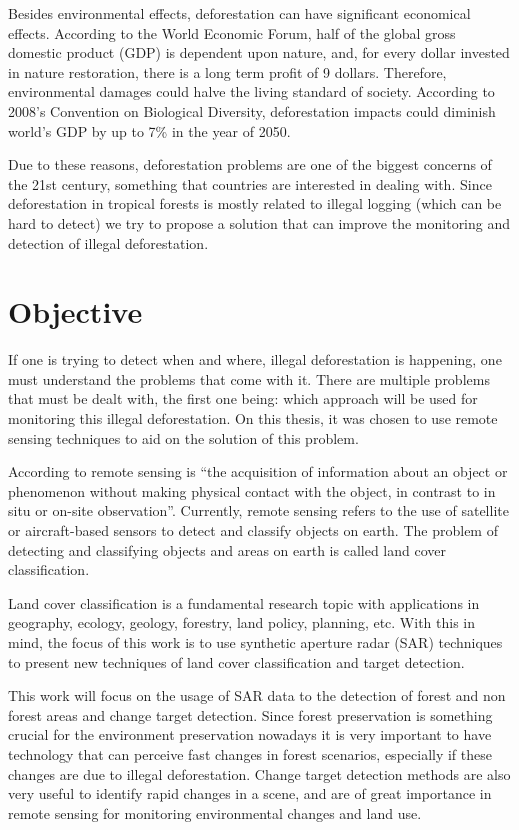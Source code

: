 Besides environmental effects, deforestation can have significant economical effects. According to the World Economic Forum, half of the global gross domestic product (GDP)
is dependent upon nature, and, for every dollar invested in nature restoration, there is a long term profit of 9 dollars. Therefore, environmental damages could halve the living standard of society.
According to 2008's Convention on Biological Diversity, deforestation impacts could diminish world's GDP by up to 7\% in the year of 2050.

Due to these reasons, deforestation problems are one of the biggest concerns of the 21st century, something that countries are interested in dealing with. Since deforestation in tropical forests is mostly related to illegal
logging (which can be hard to detect) we try to propose a solution that can improve the monitoring and detection of illegal deforestation.

\section{Objective}

If one is trying to detect when and where, illegal deforestation is happening, one must understand the problems that come with it. There are multiple problems that must be dealt with, the first one being: which approach will be used for
monitoring this illegal deforestation. On this thesis, it was chosen to use remote sensing techniques to aid on the solution of this problem.

According to \cite{Schott1996RemoteST} remote sensing is ``the acquisition of information about an object or phenomenon without making physical contact with the object, in contrast to in situ or on-site observation''. Currently, remote sensing
refers to the use of satellite or aircraft-based sensors to detect and classify objects on earth. The problem of detecting and classifying objects and areas on earth is called land cover classification.

Land cover classification is a fundamental research topic with applications in geography,
ecology, geology, forestry, land policy, planning, etc. With this in mind, the focus of this work is to use synthetic aperture radar (SAR) techniques to present
new techniques of land cover classification and target detection.

This work will focus on the usage of SAR data to the detection of forest and non
forest areas and change target detection. Since forest preservation is something crucial
for the environment preservation nowadays it is very important to have technology that
can perceive fast changes in forest scenarios, especially if these changes are due to
illegal deforestation. Change target detection methods are also very useful to identify
rapid changes in a scene, and are of great importance in remote sensing for monitoring
environmental changes and land use.

